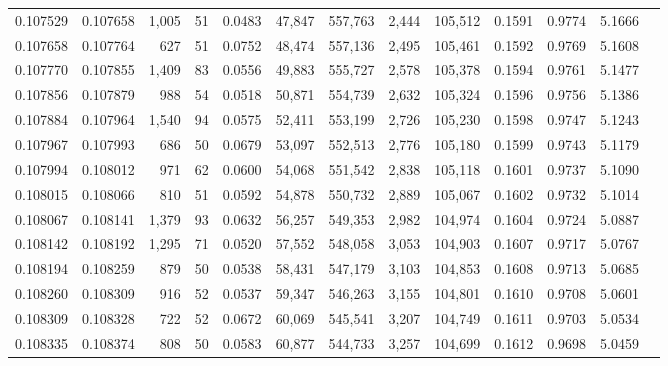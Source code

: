 \begin{tabular}{rrrrrrrrrrrrr}
0.107529 & 0.107658 & 1,005 &  51 &                                     0.0483 &  47,847 & 557,763 &   2,444 & 105,512 & 0.1591 & 0.9774 & 5.1666 \\
0.107658 & 0.107764 &   627 &  51 &                                     0.0752 &  48,474 & 557,136 &   2,495 & 105,461 & 0.1592 & 0.9769 & 5.1608 \\
0.107770 & 0.107855 & 1,409 &  83 &                                     0.0556 &  49,883 & 555,727 &   2,578 & 105,378 & 0.1594 & 0.9761 & 5.1477 \\
0.107856 & 0.107879 &   988 &  54 &                                     0.0518 &  50,871 & 554,739 &   2,632 & 105,324 & 0.1596 & 0.9756 & 5.1386 \\
0.107884 & 0.107964 & 1,540 &  94 &                                     0.0575 &  52,411 & 553,199 &   2,726 & 105,230 & 0.1598 & 0.9747 & 5.1243 \\
0.107967 & 0.107993 &   686 &  50 &                                     0.0679 &  53,097 & 552,513 &   2,776 & 105,180 & 0.1599 & 0.9743 & 5.1179 \\
0.107994 & 0.108012 &   971 &  62 &                                     0.0600 &  54,068 & 551,542 &   2,838 & 105,118 & 0.1601 & 0.9737 & 5.1090 \\
0.108015 & 0.108066 &   810 &  51 &                                     0.0592 &  54,878 & 550,732 &   2,889 & 105,067 & 0.1602 & 0.9732 & 5.1014 \\
0.108067 & 0.108141 & 1,379 &  93 &                                     0.0632 &  56,257 & 549,353 &   2,982 & 104,974 & 0.1604 & 0.9724 & 5.0887 \\
0.108142 & 0.108192 & 1,295 &  71 &                                     0.0520 &  57,552 & 548,058 &   3,053 & 104,903 & 0.1607 & 0.9717 & 5.0767 \\
0.108194 & 0.108259 &   879 &  50 &                                     0.0538 &  58,431 & 547,179 &   3,103 & 104,853 & 0.1608 & 0.9713 & 5.0685 \\
0.108260 & 0.108309 &   916 &  52 &                                     0.0537 &  59,347 & 546,263 &   3,155 & 104,801 & 0.1610 & 0.9708 & 5.0601 \\
0.108309 & 0.108328 &   722 &  52 &                                     0.0672 &  60,069 & 545,541 &   3,207 & 104,749 & 0.1611 & 0.9703 & 5.0534 \\
0.108335 & 0.108374 &   808 &  50 &                                     0.0583 &  60,877 & 544,733 &   3,257 & 104,699 & 0.1612 & 0.9698 & 5.0459 \\

\end{tabular}
